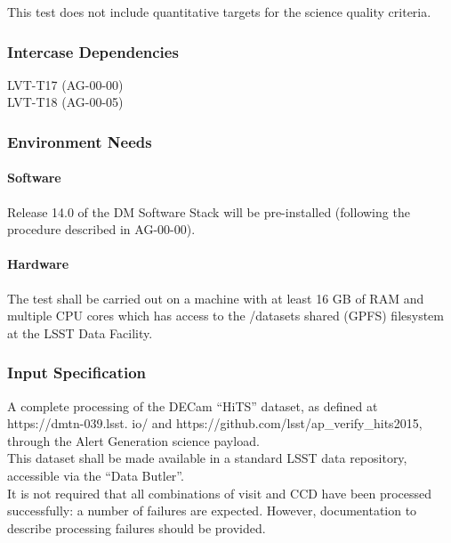 This test does not include quantitative targets for the science quality
criteria.





\subsubsection{Intercase Dependencies}

LVT-T17 (AG-00-00)\\
LVT-T18 (AG-00-05)



\subsubsection{Environment Needs}

\paragraph{Software}

Release 14.0 of the DM Software Stack will be pre-installed (following
the procedure described in AG-00-00).



\paragraph{Hardware}

The test shall be carried out on a machine with at least 16 GB of RAM
and multiple CPU cores which has access to the /datasets shared (GPFS)
filesystem at the LSST Data Facility.



\subsubsection{Input Specification}

A complete processing of the DECam ``HiTS'' dataset, as defined at
https://dmtn-039.lsst. io/ and
https://github.com/lsst/ap\_verify\_hits2015, through the Alert
Generation science payload.\\
This dataset shall be made available in a standard LSST data repository,
accessible via the ``Data Butler''.\\
It is not required that all combinations of visit and CCD have been
processed successfully: a number of failures are expected. However,
documentation to describe processing failures should be provided.



